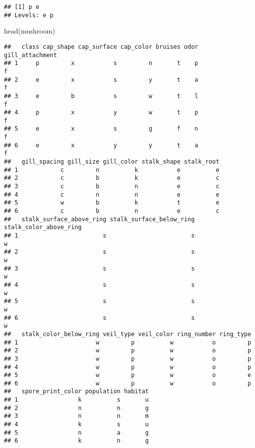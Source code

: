 \documentclass[
]{article}
\newenvironment{Shaded}{\begin{snugshade}}{\end{snugshade}}
\newcommand{\FunctionTok}[1]{\textcolor[rgb]{0.00,0.00,0.00}{#1}}
\newcommand{\NormalTok}[1]{#1}
\begin{document}
\begin{verbatim}
## [1] p e
## Levels: e p
\end{verbatim}

\begin{Shaded}
\begin{Highlighting}[]
\FunctionTok{head}\NormalTok{(mushroom)}
\end{Highlighting}
\end{Shaded}

\begin{verbatim}
##   class cap_shape cap_surface cap_color bruises odor gill_attachment
## 1     p         x           s         n       t    p               f
## 2     e         x           s         y       t    a               f
## 3     e         b           s         w       t    l               f
## 4     p         x           y         w       t    p               f
## 5     e         x           s         g       f    n               f
## 6     e         x           y         y       t    a               f
##   gill_spacing gill_size gill_color stalk_shape stalk_root
## 1            c         n          k           e          e
## 2            c         b          k           e          c
## 3            c         b          n           e          c
## 4            c         n          n           e          e
## 5            w         b          k           t          e
## 6            c         b          n           e          c
##   stalk_surface_above_ring stalk_surface_below_ring stalk_color_above_ring
## 1                        s                        s                      w
## 2                        s                        s                      w
## 3                        s                        s                      w
## 4                        s                        s                      w
## 5                        s                        s                      w
## 6                        s                        s                      w
##   stalk_color_below_ring veil_type veil_color ring_number ring_type
## 1                      w         p          w           o         p
## 2                      w         p          w           o         p
## 3                      w         p          w           o         p
## 4                      w         p          w           o         p
## 5                      w         p          w           o         e
## 6                      w         p          w           o         p
##   spore_print_color population habitat
## 1                 k          s       u
## 2                 n          n       g
## 3                 n          n       m
## 4                 k          s       u
## 5                 n          a       g
## 6                 k          n       g
\end{verbatim}
\end{document}
